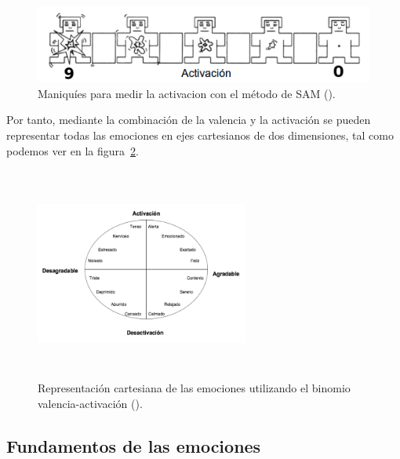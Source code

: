 \begin{figure}[h]
    \centering
    \includegraphics[scale=0.75]{Imagenes/activacion-num}
    \caption[Maniquíes para medir la activación con el método de SAM extraídos del texto de Hernández (\citeyear{hernandez2016clasificacion}).]{Maniquíes para medir la activacion con el método de SAM (\citep{hernandez2016clasificacion}).}
    \label{fig:activacion-num}
\end{figure}

Por tanto, mediante la combinación de la valencia y la activación se pueden representar todas las emociones en ejes cartesianos de dos dimensiones, tal como podemos ver en la figura~\ref{fig:valAct2}.

\begin{figure}[h]
    \centering
    \includegraphics[width=7cm, height=7cm]{Imagenes/valAct2}
    \caption[Representación cartesiana de las emociones utilizando el binomio valencia-activación extraída del texto de Hernández (\citeyear{hernandez2016clasificacion}).]{Representación cartesiana de las emociones utilizando el binomio valencia-activación (\citep{hernandez2016clasificacion}).}
    \label{fig:valAct2}
\end{figure}


\subsection{Fundamentos de las emociones}
